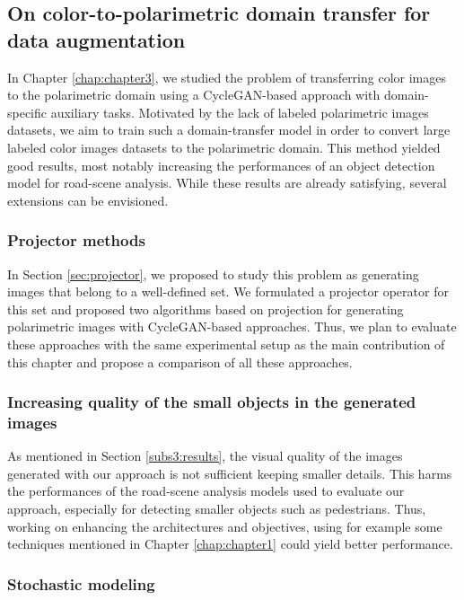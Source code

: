 \subsection*{On color-to-polarimetric domain transfer for data augmentation}

In Chapter \ref{chap:chapter3}, we studied the problem of transferring color images to the polarimetric domain using a CycleGAN-based approach with domain-specific auxiliary tasks. Motivated by the lack of labeled polarimetric images datasets, we aim to train such a domain-transfer model in order to convert large labeled color images datasets to the polarimetric domain.  This method yielded good results, most notably increasing the performances of an object detection model for road-scene analysis. While these results are already satisfying, several extensions can be envisioned.

\subsubsection*{Projector methods}

In Section \ref{sec:projector}, we proposed to study this problem as generating images that belong to a well-defined set. We formulated a projector operator for this set and proposed two algorithms based on projection for generating polarimetric images with CycleGAN-based approaches. Thus, we plan to evaluate these approaches with the same experimental setup as the main contribution of this chapter and propose a comparison of all these approaches.

\subsubsection*{Increasing quality of the small objects in the generated images}

As mentioned in Section \ref{subs3:results}, the visual quality of the images generated with our approach is not sufficient keeping smaller details. This harms the performances of the road-scene analysis models used to evaluate our approach, especially for detecting smaller objects such as pedestrians. Thus, working on enhancing the architectures and objectives, using for example some techniques mentioned in Chapter \ref{chap:chapter1} could yield better performance.

\subsubsection*{Stochastic modeling}

